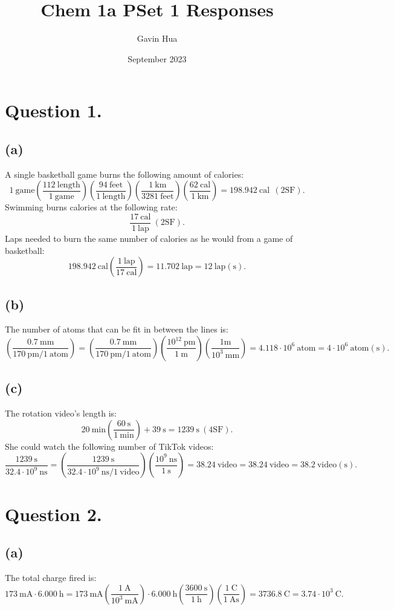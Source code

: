 \documentclass{article}
\title{Chem 1a PSet 1 Responses}
\author{Gavin Hua}
\date{September 2023}
\begin{document}
\maketitle

\section*{Question 1.}
\subsection*{(a)}
A single basketball game burns the following amount of calories:
$$
1\mathrm{~game}(\frac{112\mathrm{~length}}{1\mathrm{~game}})(\frac{94\mathrm{~feet}}{1\mathrm{~length}}) (\frac{1\mathrm{~km}}{3281\mathrm{~feet}}) (\frac{62\mathrm{~cal}}{1\mathrm{~km}}) = 198.942\mathrm{~cal~~(2SF)}.
$$
Swimming burns calories at the following rate:
$$
\frac{17\mathrm{~cal}}{1\mathrm{~lap}} \mathrm{~(2SF)}.
$$
Laps needed to burn the same number of calories as he would from a game of basketball:
$$
198.942\mathrm{~cal} (\frac{1\mathrm{~lap}}{17\mathrm{~cal}}) = 11.702 \mathrm{~lap} = 12 \mathrm{~lap(s)}.
$$
\subsection*{(b)}
The number of atoms that can be fit in between the lines is:
$$
(\frac{0.7\mathrm{~mm}}{170\mathrm{~pm} / 1 \mathrm{~atom}}) = (\frac{0.7\mathrm{~mm}}{170\mathrm{~pm} / 1 \mathrm{~atom}}) (\frac{10^{12} \mathrm{~pm}}{1 \mathrm{~m}}) (\frac{1 \mathrm{m}}{10^3 \mathrm{~mm}}) = 4.118 \cdot 10^6 \mathrm{~atom} = 4 \cdot 10^6 \mathrm{~atom(s)}.
$$
\subsection*{(c)}
The rotation video's length is:
$$
20\mathrm{~min} (\frac{60\mathrm{~s}}{1\mathrm{~min}}) + 39 \mathrm{~s} = 1239 \mathrm{~s~(4SF)}.
$$
She could watch the following number of TikTok videos:
$$
\frac{1239 \mathrm{~s}}{32.4 \cdot 10^9 \mathrm{~ns}} = (\frac{1239 \mathrm{~s}}{32.4 \cdot 10^9 \mathrm{~ns} / 1 \mathrm{~video}}) (\frac{10^9 \mathrm{~ns}}{1 \mathrm{~s}}) = 38.24 \mathrm{~video} = 38.24 \mathrm{~video} = 38.2 \mathrm{~video(s)}.
$$
\newpage

\section*{Question 2.}
\subsection*{(a)}
The total charge fired is:
$$
173\mathrm{~mA} \cdot 6.000 \mathrm{~h} = 173 \mathrm{~mA} (\frac{1\mathrm{~A}}{10^3 \mathrm{~mA}}) \cdot 6.000 \mathrm{~h} (\frac{3600\mathrm{~s}}{1\mathrm{~h}}) (\frac{1\mathrm{~C}}{1 \mathrm{~As}}) = 3736.8 \mathrm{~C} = 3.74\cdot10^3 \mathrm{~C}.
$$
\end{document}
